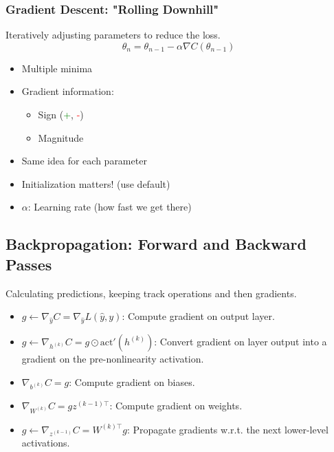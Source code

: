 \subsubsection{Gradient Descent: "Rolling Downhill"}
\begin{definition}
    Iteratively adjusting parameters to reduce the loss. 
    \begin{equation*}
        \theta_n = \theta_{n-1} - \alpha \nabla C(\theta_{n-1})
    \end{equation*}
    \begin{itemize}
        \item Multiple minima
        \item Gradient information:
        \begin{itemize}
            \item Sign (\textcolor{green}{+}, \textcolor{red}{-})
            \item Magnitude
        \end{itemize}
        \item Same idea for each parameter
        \item Initialization matters! (use default)
        \item \(\alpha\): Learning rate (how fast we get there) 
    \end{itemize}
\end{definition}

\subsection{Backpropagation: Forward and Backward Passes}
\begin{definition}
    Calculating predictions, keeping track operations and then gradients.
    \begin{itemize}
        \item $g \leftarrow \nabla_{\hat{y}} C = \nabla_{\hat{y}} L(\hat{y}, y)$: Compute gradient on output layer.
        \item $g \leftarrow \nabla_{h^{(k)}} C = g \odot \text{act}'(h^{(k)})$: Convert gradient on layer output into a gradient on the pre-nonlinearity activation.
        \item $\nabla_{b^{(k)}} C = g$: Compute gradient on biases.
        \item $\nabla_{W^{(k)}} C = g z^{(k-1)\top}$: Compute gradient on weights.
        \item $g \gets \nabla_{z^{(k-1)}} C = W^{(k)\top} g$: Propagate gradients w.r.t. the next lower-level activations.
    \end{itemize}
\end{definition}